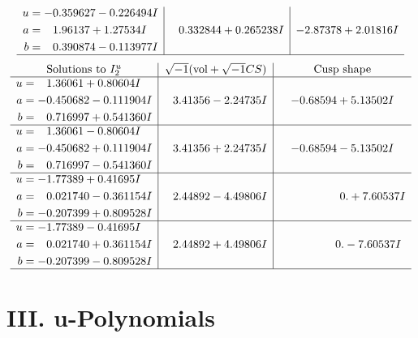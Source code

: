 \documentclass[1p]{elsarticle_modified}
\theoremstyle{definition}
\newcommand{\I}{\sqrt{-1}}
\begin{document}
$$\begin{array}{c|c|c}
\begin{aligned}
u &= -0.359627 - 0.226494 I \\
a &= \phantom{-}1.96137 + 1.27534 I \\
b &= \phantom{-}0.390874 - 0.113977 I\end{aligned}
 & \phantom{-}0.332844 + 0.265238 I & -2.87378 + 2.01816 I\\
 \hline 
 \end{array}$$\newpage$$\begin{array}{c|c|c}  
\text{Solutions to }I^u_{2}& \I (\text{vol} + \sqrt{-1}CS) & \text{Cusp shape}\\
 \hline 
\begin{aligned}
u &= \phantom{-}1.36061 + 0.80604 I \\
a &= -0.450682 - 0.111904 I \\
b &= \phantom{-}0.716997 + 0.541360 I\end{aligned}
 & \phantom{-}3.41356 - 2.24735 I & -0.68594 + 5.13502 I \\ \hline\begin{aligned}
u &= \phantom{-}1.36061 - 0.80604 I \\
a &= -0.450682 + 0.111904 I \\
b &= \phantom{-}0.716997 - 0.541360 I\end{aligned}
 & \phantom{-}3.41356 + 2.24735 I & -0.68594 - 5.13502 I \\ \hline\begin{aligned}
u &= -1.77389 + 0.41695 I \\
a &= \phantom{-}0.021740 - 0.361154 I \\
b &= -0.207399 + 0.809528 I\end{aligned}
 & \phantom{-}2.44892 - 4.49806 I & \phantom{-0.000000 -}0. + 7.60537 I \\ \hline\begin{aligned}
u &= -1.77389 - 0.41695 I \\
a &= \phantom{-}0.021740 + 0.361154 I \\
b &= -0.207399 - 0.809528 I\end{aligned}
 & \phantom{-}2.44892 + 4.49806 I & \phantom{-0.000000 } 0. - 7.60537 I\\
 \hline 
 \end{array}$$\newpage
\newpage\renewcommand{\arraystretch}{1}
\centering \section*{ III. u-Polynomials}
\end{document}
